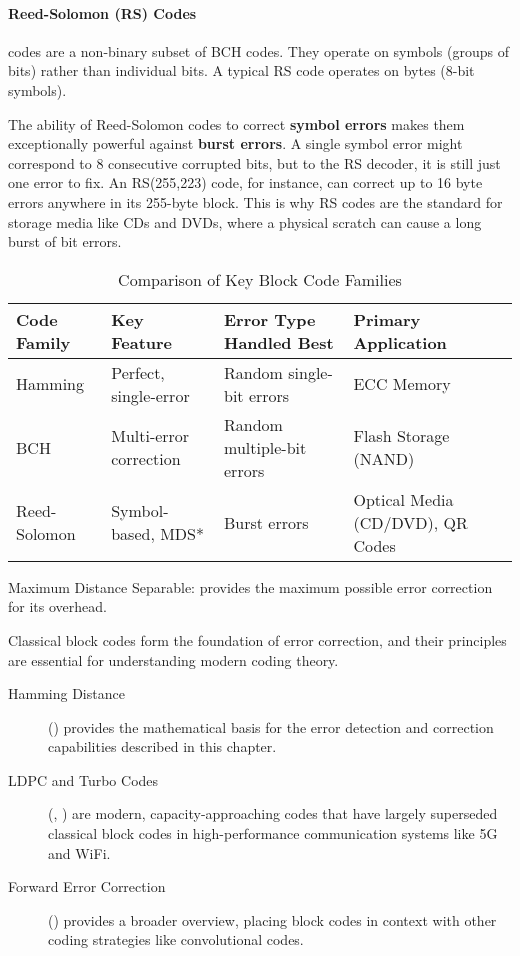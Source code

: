 \paragraph{Reed-Solomon (RS) Codes}
 codes are a non-binary subset of BCH codes. They operate on symbols (groups of bits) rather than individual bits. A typical RS code operates on bytes (8-bit symbols).
\begin{warningbox}
    The ability of Reed-Solomon codes to correct \textbf{symbol errors} makes them exceptionally powerful against \textbf{burst errors}. A single symbol error might correspond to 8 consecutive corrupted bits, but to the RS decoder, it is still just one error to fix. An RS(255,223) code, for instance, can correct up to 16 byte errors anywhere in its 255-byte block. This is why RS codes are the standard for storage media like CDs and DVDs, where a physical scratch can cause a long burst of bit errors.
\end{warningbox}

\begin{table}[H]
    \centering
    \caption{Comparison of Key Block Code Families}
    \label{tab:block-code-summary}
    \begin{tabular}{@{}llll@{}}
        \toprule
        \tableheaderfont Code Family & \tableheaderfont Key Feature & \tableheaderfont Error Type Handled Best & \tableheaderfont Primary Application \\
        \midrule
        Hamming & Perfect, single-error & Random single-bit errors & ECC Memory \\
        BCH & Multi-error correction & Random multiple-bit errors & Flash Storage (NAND) \\
        Reed-Solomon & Symbol-based, MDS* & Burst errors & Optical Media (CD/DVD), QR Codes \\
        \bottomrule
    \end{tabular}
    \par\vspace{0.5em}
    \small *Maximum Distance Separable: provides the maximum possible error correction for its overhead.
\end{table}


\begin{importantbox}[title={Further Reading}]
    Classical block codes form the foundation of error correction, and their principles are essential for understanding modern coding theory.
    \begin{description}
        \item[Hamming Distance] () provides the mathematical basis for the error detection and correction capabilities described in this chapter.
        \item[LDPC and Turbo Codes] (, ) are modern, capacity-approaching codes that have largely superseded classical block codes in high-performance communication systems like 5G and WiFi.
        \item[Forward Error Correction] () provides a broader overview, placing block codes in context with other coding strategies like convolutional codes.
    \end{description}
\end{importantbox}